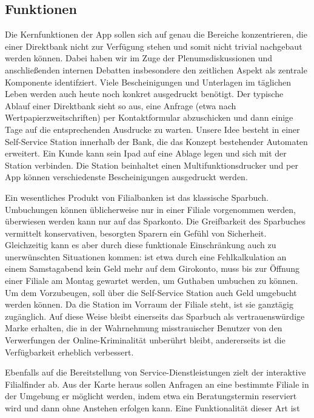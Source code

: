 \documentclass[a4paper, 12pt]{scrartcl}
\begin{document}
    \subsection{Funktionen}
    Die Kernfunktionen der App sollen sich auf genau die Bereiche konzentrieren, die einer Direktbank nicht zur Verfügung stehen und somit nicht trivial nachgebaut werden können. Dabei haben wir im Zuge der Plenumsdiskussionen und anschließenden internen Debatten insbesondere den zeitlichen Aspekt als zentrale Komponente identifziert. Viele Bescheinigungen und Unterlagen im täglichen Leben werden auch heute noch konkret ausgedruckt benötigt. Der typische Ablauf einer Direktbank sieht so aus, eine Anfrage (etwa nach Wertpapierzweitschriften) per Kontaktformular abzuschicken und dann einige Tage auf die entsprechenden Ausdrucke zu warten. Unsere Idee besteht in einer Self-Service Station innerhalb der Bank, die das Konzept bestehender Automaten erweitert. Ein Kunde kann sein Ipad auf eine Ablage legen und sich mit der Station verbinden. Die Station beinhaltet einen Multifunktionsdrucker und per App können verschiedenste Bescheinigungen ausgedruckt werden. 
    
    Ein wesentliches Produkt von Filialbanken ist das klassische Sparbuch. Umbuchungen können üblicherweise nur in einer Filiale vorgenommen werden, überwiesen werden kann nur auf das Sparkonto. Die Greifbarkeit des Sparbuches vermittelt konservativen, besorgten Sparern ein Gefühl von Sicherheit. Gleichzeitig kann es aber durch diese funktionale Einschränkung auch zu unerwünschten Situationen kommen: ist etwa durch eine Fehlkalkulation an einem Samstagabend kein Geld mehr auf dem Girokonto, muss bis zur Öffnung einer Filiale am Montag gewartet werden, um Guthaben umbuchen zu können. Um dem Vorzubeugen, soll über die Self-Service Station auch Geld umgebucht werden können. Da die Station im Vorraum der Filiale steht, ist sie ganztägig zugänglich. Auf diese Weise bleibt einerseits das Sparbuch als vertrauenswürdige Marke erhalten, die in der Wahrnehmung misstrauischer Benutzer von den Verwerfungen der Online-Kriminalität unberührt bleibt, andererseits ist die Verfügbarkeit erheblich verbessert.
    
    Ebenfalls auf die Bereitstellung von Service-Dienstleistungen zielt der interaktive Filialfinder ab. Aus der Karte heraus sollen Anfragen an eine bestimmte Filiale in der Umgebung er möglicht werden, indem etwa ein Beratungstermin reserviert wird und dann ohne Anstehen erfolgen kann. Eine Funktionalität dieser Art ist 
      
\end{document}
